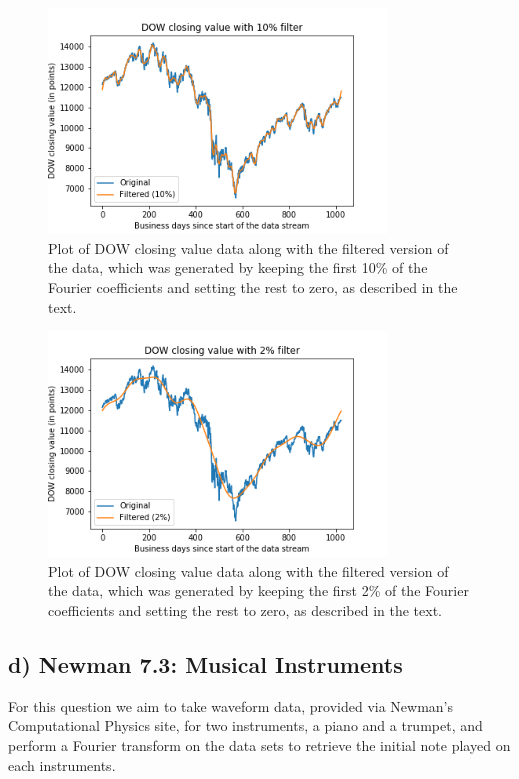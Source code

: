 \documentclass{article}
\begin{document}
\begin{figure}[H]
	\centering
	\includegraphics[width=0.8\textwidth]{../images/1b_filtered_10.png}
	\caption{Plot of DOW closing value data along with the filtered version of the data, which was generated by keeping the first 10\% of the Fourier coefficients and setting the rest to zero, as described in the text.}
	\label{fig:1b_filtered_10}
\end{figure}

\begin{figure}[H]
	\centering
	\includegraphics[width=0.8\textwidth]{../images/1b_filtered_02.png}
	\caption{Plot of DOW closing value data along with the filtered version of the data, which was generated by keeping the first 2\% of the Fourier coefficients and setting the rest to zero, as described in the text.}
	\label{fig:1b_filtered_02}
\end{figure}


\subsection{d) Newman 7.3: Musical Instruments}
For this question we aim to take waveform data, provided via Newman's Computational Physics site, for two instruments, a piano and a trumpet, and perform a Fourier transform on the data sets to retrieve the initial note played on each instruments. 
\end{document}
